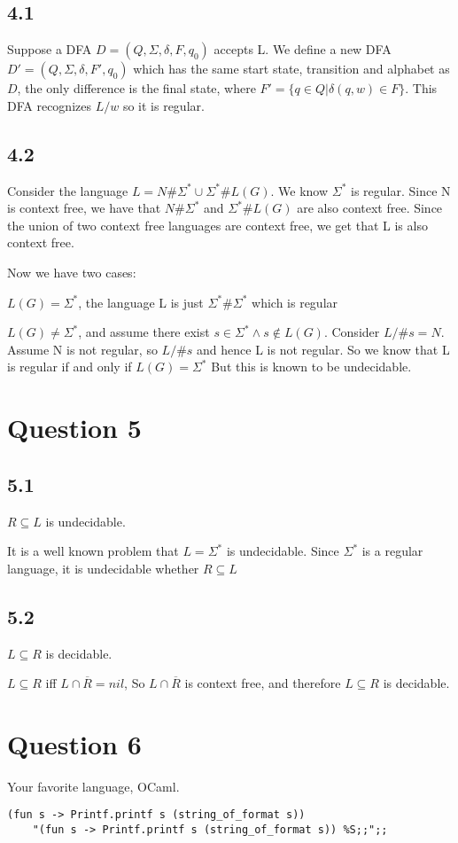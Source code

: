 \documentclass[a4paper, 11pt]{article}
\begin{document}
\subsection*{4.1}
Suppose a DFA $D=(Q,\Sigma, \delta, F, q_0)$ accepts L. We define a new DFA $D'=(Q,\Sigma, \delta, F', q_0)$ which has the same start state, transition and alphabet as $D$, the only difference is the final state, where $F'=\{q\in Q| \delta(q,w) \in F\}$. This DFA recognizes $L/w$ so it is regular.

\subsection*{4.2}
Consider the language $L= N\#\Sigma^* \cup \Sigma^*\#L(G)$. We know $\Sigma^*$ is regular. Since N is context free, we have that $N\#\Sigma^*$ and $\Sigma^*\#L(G)$ are also context free. Since the union of two context free languages are context free, we get that L is also context free.

Now we have two cases:

$L(G) = \Sigma^*$, the language L is just $\Sigma^*\#\Sigma^*$ which is regular

$L(G) \neq \Sigma^*$, and assume there exist $s \in \Sigma^* \land s \notin L(G) $. Consider $L/\#s=N$. Assume N is not regular, so $L/\#s$ and hence L is not regular. So we know that L is regular if and only if $L(G) = \Sigma^*$ But this is known to be undecidable.

\section*{Question 5}
\subsection*{5.1}
$R \subseteq L$ is undecidable.

It is a well known problem that $L=\Sigma^*$ is undecidable. Since $\Sigma^*$ is a regular language, it is undecidable whether $R \subseteq L$

\subsection*{5.2}
$L \subseteq R$ is decidable.

$L \subseteq R$ iff $L\cap \overline R = nil$, So $L\cap \overline R$ is context free, and therefore $L \subseteq R$ is decidable.

\section*{Question 6}
Your favorite language, OCaml.
\begin{verbatim}
(fun s -> Printf.printf s (string_of_format s)) 
    "(fun s -> Printf.printf s (string_of_format s)) %S;;";;
\end{verbatim}
\end{document}
